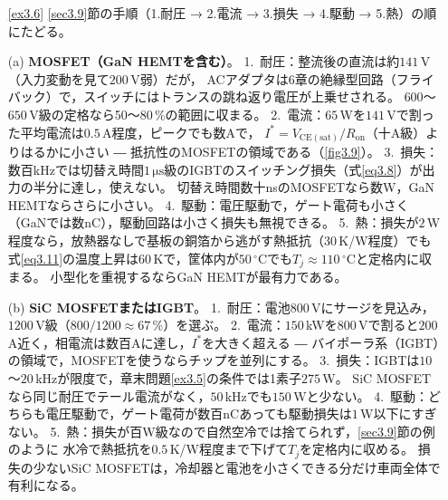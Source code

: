 \begin{enumerate}
(b) $P_{\mathrm{sw}}$は周波数に比例するから$200\times5 = 1000$\,Wとなり，
$P_{\mathrm{total}} = 1075$\,W。
損失は4倍近くに跳ね上がり，冷却が現実的でなくなる。
IGBTのインバータが数十kHz以下で運転される理由である。

(c) 導通損失は
$P_{\mathrm{cond}} = R_{\mathrm{on}}I^2D = 0.01\times100^2\times0.5 = 50$\,W。
スイッチング損失は
\begin{equation*}
P_{\mathrm{sw}} = \frac{1}{2}\times400\times100\times100\times10^{-9}\times5\times10^4
= 100\,\mathrm{W}
\end{equation*}
総損失は$150$\,Wで，(b)の約7分の1である。
切り替え時間が10分の1になったことで，
周波数を5倍に上げてなお損失を減らせる。
これがワイドギャップ半導体による高周波化の定量的な意味である。

\item[\ref{ex3.6}]
\ref{sec3.9}節の手順（1.耐圧 → 2.電流 → 3.損失 → 4.駆動 → 5.熱）の順にたどる。

(a) \textbf{MOSFET（GaN HEMTを含む）}。
1.~耐圧：整流後の直流は約$141$\,V（入力変動を見て$200$\,V弱）だが，
ACアダプタは6章の絶縁型回路（フライバック）で，スイッチにはトランスの跳ね返り電圧が上乗せされる。
$600$〜$650$\,V級の定格なら50〜80\,\%の範囲に収まる。
2.~電流：$65$\,Wを$141$\,Vで割った平均電流は$0.5$\,A程度，ピークでも数Aで，
$I^* = V_{\mathrm{CE(sat)}}/R_{\mathrm{on}}$（十A級）よりはるかに小さい ― 抵抗性のMOSFETの領域である（\ref{fig3.9}）。
3.~損失：数百kHzでは切替え時間$1\,\mathrm{\mu s}$級のIGBTのスイッチング損失（式\ref{eq3.8}）が出力の半分に達し，使えない。
切替え時間数十nsのMOSFETなら数W，GaN HEMTならさらに小さい。
4.~駆動：電圧駆動で，ゲート電荷も小さく（GaNでは数nC），駆動回路は小さく損失も無視できる。
5.~熱：損失が$2$\,W程度なら，放熱器なしで基板の銅箔から逃がす熱抵抗（$30$\,K/W程度）でも
式\ref{eq3.11}の温度上昇は$60$\,Kで，筐体内が$50\,^{\circ}$Cでも$T_j \approx 110\,^{\circ}$Cと定格内に収まる。
小型化を重視するならGaN HEMTが最有力である。

(b) \textbf{SiC MOSFETまたはIGBT}。
1.~耐圧：電池$800$\,Vにサージを見込み，$1200$\,V級（$800/1200 \approx 67\,\%$）を選ぶ。
2.~電流：$150$\,kWを$800$\,Vで割ると$200$\,A近く，相電流は数百Aに達し，$I^*$を大きく超える ―
バイポーラ系（IGBT）の領域で，MOSFETを使うならチップを並列にする。
3.~損失：IGBTは$10$〜$20$\,kHzが限度で，章末問題\ref{ex3.5}の条件では1素子$275$\,W。
SiC MOSFETなら同じ耐圧でテール電流がなく，$50$\,kHzでも$150$\,Wと少ない。
4.~駆動：どちらも電圧駆動で，ゲート電荷が数百nCあっても駆動損失は$1$\,W以下にすぎない。
5.~熱：損失が百W級なので自然空冷では捨てられず，\ref{sec3.9}節の例のように
水冷で熱抵抗を$0.5$\,K/W程度まで下げて$T_j$を定格内に収める。
損失の少ないSiC MOSFETは，冷却器と電池を小さくできる分だけ車両全体で有利になる。


\end{enumerate}
